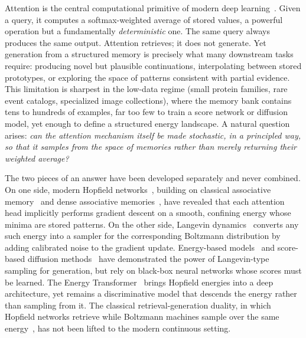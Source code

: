 
Attention is the central computational primitive of modern deep learning~\cite{vaswaniAttentionAllYou2017}. Given a query, it computes a softmax-weighted average of stored values, a powerful operation but a fundamentally \emph{deterministic} one. The same query always produces the same output. Attention retrieves; it does not generate. Yet generation from a structured memory is precisely what many downstream tasks require: producing novel but plausible continuations, interpolating between stored prototypes, or exploring the space of patterns consistent with partial evidence. This limitation is sharpest in the low-data regime (small protein families, rare event catalogs, specialized image collections), where the memory bank contains tens to hundreds of examples, far too few to train a score network or diffusion model, yet enough to define a structured energy landscape. A natural question arises: \emph{can the attention mechanism itself be made stochastic, in a principled way, so that it samples from the space of memories rather than merely returning their weighted average?}

The two pieces of an answer have been developed separately and never combined. On one side, modern Hopfield networks~\cite{ramsauerHopfieldNetworksAll2021}, building on classical associative memory~\cite{hopfieldNeuralNetworksPhysical1982} and dense associative memories~\cite{krotovDenseAssociativeMemory2016,krotovLargeAssociativeMemory2021}, have revealed that each attention head implicitly performs gradient descent on a smooth, confining energy whose minima are stored patterns. On the other side, Langevin dynamics~\cite{robertsTweedieExponentialConvergence1996,wellingBayesianLearningStochastic2011,durmusNonasymptoticAnalysisUnadjusted2017} converts any such energy into a sampler for the corresponding Boltzmann distribution by adding calibrated noise to the gradient update. Energy-based models~\cite{lecunTutorialEnergyBased2006,songHowTrainEnergyBased2021} and score-based diffusion methods~\cite{songGenerativeModelingEstimating2019,songScoreBasedGenerativeModeling2021} have demonstrated the power of Langevin-type sampling for generation, but rely on black-box neural networks whose scores must be learned. The Energy Transformer~\cite{hooverEnergyTransformer2024} brings Hopfield energies into a deep architecture, yet remains a discriminative model that descends the energy rather than sampling from it. The classical retrieval-generation duality, in which Hopfield networks retrieve while Boltzmann machines sample over the same energy~\cite{ackleyLearningAlgorithmBoltzmann1985}, has not been lifted to the modern continuous setting.

